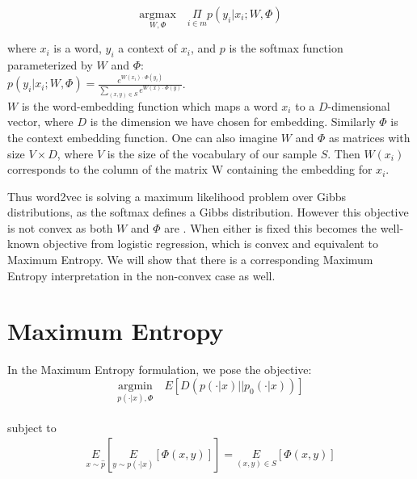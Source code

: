 \documentclass[]{article}
\begin{document}
\begin{equation} \underset{W,\Phi}{\text{argmax}} \quad \underset{i \in m}{\Pi}{p(y_i|x_i; W, \Phi)}\label{eq:gibbs}\end{equation} 

\noindent where $x_i$ is a word, $y_i$ a context of $x_i$, and $p$ is the softmax function parameterized by $W$ and $\Phi$:\\

$p(y_i|x_i; W,\Phi) = \frac{e^{W(x_i) \cdot \Phi(y_i)}}{\sum_{(x,y) \in S}e^{W(x) \cdot \Phi(y)}}$.\\

$W$ is the word-embedding function which maps a word $x_i$ to a $D$-dimensional vector, where $D$ is the dimension we have chosen for embedding. Similarly $\Phi$ is the context embedding function. One can also imagine $W$ and $\Phi$ as matrices with size $V \times D$, where $V$ is the size of the vocabulary of our sample $S$. Then $W(x_i)$ corresponds to the column of the matrix W containing the embedding for $x_i$.

Thus word2vec is solving a maximum likelihood problem over Gibbs distributions, as the softmax defines a Gibbs distribution. However this objective is not convex as both $W$ and $\Phi$ are . When either is fixed this becomes the well-known objective from logistic regression, which is convex and equivalent to Maximum Entropy\cite{dummy}. We will show that there is a corresponding Maximum Entropy interpretation in the non-convex case as well. 

\section{Maximum Entropy}

In the Maximum Entropy formulation, we pose the objective:\\

\begin{equation}\underset{p(\cdot | x), \Phi}{\text{argmin}} \quad E\left[ D(p(\cdot|x) \vert \vert  p_0(\cdot|x))\right] \label{eq:maxent}
\end{equation}
\\

\noindent subject to\\

\begin{align}\underset{x \sim \hat{p}}{E}\left[\underset{y \sim p(\cdot|x)}{E}\left[\Phi(x,y)\right]\right] = \underset{(x,y) \in S}{E}\left[\Phi(x,y)\right]
\end{align}
\end{document}
